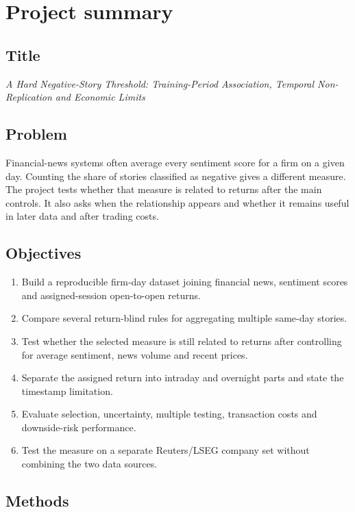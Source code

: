\chapter{Project summary}
\label{app:project-summary}

\section*{Title}

\textit{A Hard Negative-Story Threshold: Training-Period Association, Temporal Non-Replication and Economic Limits}

\section*{Problem}

Financial-news systems often average every sentiment score for a firm on a given
day. Counting the share of stories classified as negative gives a different
measure. The project tests whether that measure is related to returns after the
main controls. It also asks when the relationship appears and whether it remains
useful in later data and after trading costs.

\section*{Objectives}

\begin{enumerate}
  \item Build a reproducible firm-day dataset joining financial news, sentiment scores and assigned-session open-to-open returns.
  \item Compare several return-blind rules for aggregating multiple same-day stories.
  \item Test whether the selected measure is still related to returns after controlling for average sentiment, news volume and recent prices.
  \item Separate the assigned return into intraday and overnight parts and state the timestamp limitation.
  \item Evaluate selection, uncertainty, multiple testing, transaction costs and downside-risk performance.
  \item Test the measure on a separate Reuters/LSEG company set without combining the two data sources.
\end{enumerate}

\section*{Methods}


